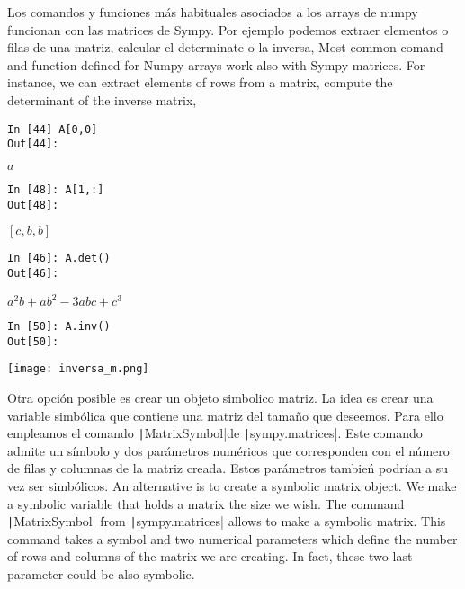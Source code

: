 \begin{paracol}{2}
Los comandos y funciones más habituales asociados a los arrays de numpy funcionan con las matrices de Sympy. Por ejemplo podemos extraer elementos o filas de una matriz, calcular el determinate o la inversa,
\switchcolumn
Most common comand and function defined for Numpy arrays work also with Sympy matrices. For instance, we can extract elements of rows from a matrix, compute the determinant of the inverse matrix, 
\end{paracol}
\begin{center}
	\begin{minipage}{.5\textwidth}
		\begin{verbatim}
In [44] A[0,0]
Out[44]: 
\end{verbatim}
$a$	 				
\begin{verbatim}
In [48]: A[1,:]
Out[48]:
\end{verbatim}
$[c,b,b]$
\begin{verbatim}
In [46]: A.det()
Out[46]: 
\end{verbatim}
$a^2b+ab^2-3abc+c^3$
\end{minipage}
\end{center}
\begin{center}
	\begin{minipage}{.5\textwidth}

\begin{verbatim}
In [50]: A.inv()
Out[50]: 
\end{verbatim}
\texttt{[image: inversa\_m.png]}
	\end{minipage}
\end{center}
\begin{paracol}{2}
Otra opción posible es crear un objeto simbolico matriz. La idea es crear una variable simbólica que contiene una matriz del tamaño que deseemos. Para ello empleamos el comando \texttt|MatrixSymbol|de \texttt|sympy.matrices|. Este comando admite un símbolo y dos parámetros numéricos que corresponden con el número de filas y columnas de la matriz creada. Estos parámetros tambień podrían a su vez ser simbólicos.
\switchcolumn
An alternative is to create a symbolic matrix object. We make a symbolic variable that holds a matrix the size we wish. The command \texttt|MatrixSymbol| from \texttt|sympy.matrices| allows to make a symbolic matrix. This command takes a symbol and two numerical parameters which define the number of rows and columns of the matrix we are creating. In fact, these two last parameter could be also symbolic.
\end{paracol}
